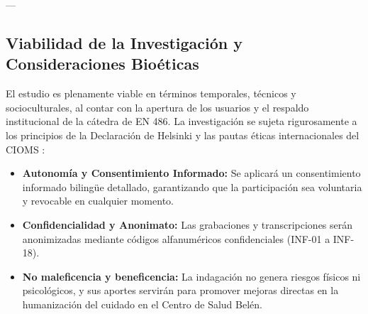 ---

\subsection{Viabilidad de la Investigación y Consideraciones Bioéticas}
\label{sec:1.4_viabilidad_bioetica}

El estudio es plenamente viable en términos temporales, técnicos y socioculturales, al contar con la apertura de los usuarios y el respaldo institucional de la cátedra de EN 486. La investigación se sujeta rigurosamente a los principios de la Declaración de Helsinki \cite{helsinki2013} y las pautas éticas internacionales del CIOMS \cite{cioms2016}:
\begin{itemize}
    \item \textbf{Autonomía y Consentimiento Informado:} Se aplicará un consentimiento informado bilingüe detallado, garantizando que la participación sea voluntaria y revocable en cualquier momento.
    \item \textbf{Confidencialidad y Anonimato:} Las grabaciones y transcripciones serán anonimizadas mediante códigos alfanuméricos confidenciales (INF-01 a INF-18).
    \item \textbf{No maleficencia y beneficencia:} La indagación no genera riesgos físicos ni psicológicos, y sus aportes servirán para promover mejoras directas en la humanización del cuidado en el Centro de Salud Belén.
\end{itemize}

\newpage
